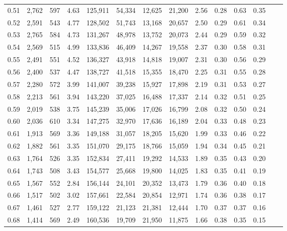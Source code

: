 \begin{tabular}{rrrrrrrrrrrrrr}
0.51 &  2,762 &  597 &    4.63 &  125,911 &   54,334 &  12,625 &  21,200 &  2.56 &  0.28 &  0.63 &      0.35 \\
0.52 &  2,591 &  543 &    4.77 &  128,502 &   51,743 &  13,168 &  20,657 &  2.50 &  0.29 &  0.61 &      0.34 \\
0.53 &  2,765 &  584 &    4.73 &  131,267 &   48,978 &  13,752 &  20,073 &  2.44 &  0.29 &  0.59 &      0.32 \\
0.54 &  2,569 &  515 &    4.99 &  133,836 &   46,409 &  14,267 &  19,558 &  2.37 &  0.30 &  0.58 &      0.31 \\
0.55 &  2,491 &  551 &    4.52 &  136,327 &   43,918 &  14,818 &  19,007 &  2.31 &  0.30 &  0.56 &      0.29 \\
0.56 &  2,400 &  537 &    4.47 &  138,727 &   41,518 &  15,355 &  18,470 &  2.25 &  0.31 &  0.55 &      0.28 \\
0.57 &  2,280 &  572 &    3.99 &  141,007 &   39,238 &  15,927 &  17,898 &  2.19 &  0.31 &  0.53 &      0.27 \\
0.58 &  2,213 &  561 &    3.94 &  143,220 &   37,025 &  16,488 &  17,337 &  2.14 &  0.32 &  0.51 &      0.25 \\
0.59 &  2,019 &  538 &    3.75 &  145,239 &   35,006 &  17,026 &  16,799 &  2.08 &  0.32 &  0.50 &      0.24 \\
0.60 &  2,036 &  610 &    3.34 &  147,275 &   32,970 &  17,636 &  16,189 &  2.04 &  0.33 &  0.48 &      0.23 \\
0.61 &  1,913 &  569 &    3.36 &  149,188 &   31,057 &  18,205 &  15,620 &  1.99 &  0.33 &  0.46 &      0.22 \\
0.62 &  1,882 &  561 &    3.35 &  151,070 &   29,175 &  18,766 &  15,059 &  1.94 &  0.34 &  0.45 &      0.21 \\
0.63 &  1,764 &  526 &    3.35 &  152,834 &   27,411 &  19,292 &  14,533 &  1.89 &  0.35 &  0.43 &      0.20 \\
0.64 &  1,743 &  508 &    3.43 &  154,577 &   25,668 &  19,800 &  14,025 &  1.83 &  0.35 &  0.41 &      0.19 \\
0.65 &  1,567 &  552 &    2.84 &  156,144 &   24,101 &  20,352 &  13,473 &  1.79 &  0.36 &  0.40 &      0.18 \\
0.66 &  1,517 &  502 &    3.02 &  157,661 &   22,584 &  20,854 &  12,971 &  1.74 &  0.36 &  0.38 &      0.17 \\
0.67 &  1,461 &  527 &    2.77 &  159,122 &   21,123 &  21,381 &  12,444 &  1.70 &  0.37 &  0.37 &      0.16 \\
0.68 &  1,414 &  569 &    2.49 &  160,536 &   19,709 &  21,950 &  11,875 &  1.66 &  0.38 &  0.35 &      0.15 \\

\end{tabular}
